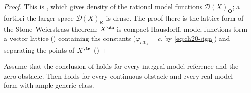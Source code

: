 \begin{proof}
This is , which gives density of
the rational model functions $\mathcal D(X)_{\mathbf Q}$; a fortiori the
larger space $\mathcal D(X)_{\mathbf R}$ is dense.  The proof there is the
lattice form of the Stone--Weierstrass theorem: $X^{\An}$ is compact
Hausdorff, model functions form a vector lattice
() containing the constants
($\varphi_{c\mathcal X_s}=c$, by \eqref{eq:ch20-sign}) and separating the
points of $X^{\An}$ ().
\end{proof}

\begin{lemma}\label{lem:ch23-reduction-to-base-ideals}
Assume that the conclusion of
 holds for every integral model
reference and the zero obstacle.  Then
 holds for every continuous obstacle and
every real model form with ample generic class.
\end{lemma}

